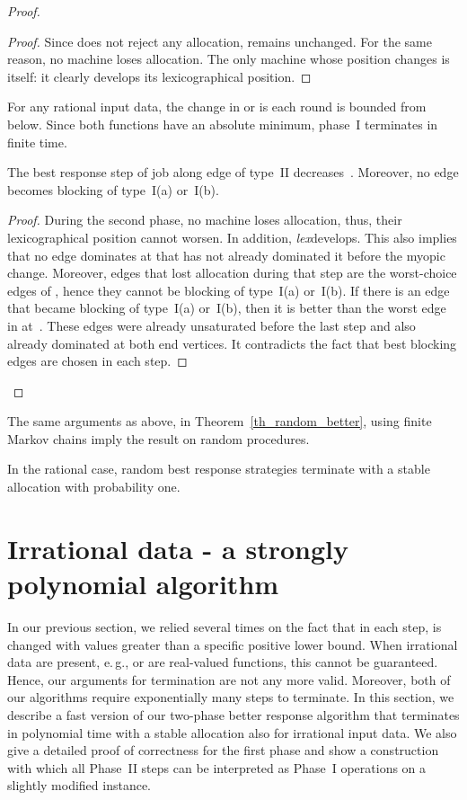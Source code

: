 \documentclass{llncs}
\newcommand{\lex}{{\slshape lex}}
\newcommand{\eg}{{e.\,g.}}
\begin{document}
\begin{proof}
	\begin{proof}
		 Since  does not reject any allocation,  remains unchanged. For the same reason, no machine loses allocation. The only machine whose position changes is  itself: it clearly develops its lexicographical position.
	\end{proof}
	
	For any rational input data, the change in  or  is each round is bounded from below. Since both functions have an absolute minimum, phase~I terminates in finite time.
	
	\begin{claim}
		The best response step of job  along edge  of type~II decreases~. Moreover, no edge becomes blocking of type~I(a) or~I(b).
	\end{claim}
	
	\begin{proof}
		 During the second phase, no machine loses allocation, thus, their lexicographical position cannot worsen. In addition, \lex develops. This also implies that no edge  dominates  at  that has not already dominated it before the myopic change. Moreover, edges that lost allocation during that step are the worst-choice edges of , hence they cannot be blocking of type~I(a) or~I(b). If there is an edge  that became blocking of type~I(a) or~I(b), then it is better than the worst edge in  at~. These edges were already unsaturated before the last step and also already dominated  at both end vertices. It contradicts the fact that best blocking edges are chosen in each step.
	\end{proof}
\end{proof}

The same arguments as above, in Theorem~\ref{th_random_better}, using finite Markov chains imply the result on random procedures.

\begin{theorem}
	In the rational case, random best response strategies terminate with a stable allocation with probability one.
\end{theorem}

\section{Irrational data - a strongly polynomial algorithm}
\label{sec:irrat}

In our previous section, we relied several times on the fact that in each step,  is changed with values greater than a specific positive lower bound. When irrational data are present, \eg,  or  are real-valued functions, this cannot be guaranteed. Hence, our arguments for termination are not any more valid. Moreover, both of our algorithms require exponentially many steps to terminate. In this section, we describe a fast version of our two-phase better response algorithm that terminates in polynomial time with a stable allocation also for irrational input data. We also give a detailed proof of correctness for the first phase and show a construction with which all Phase~II steps can be interpreted as Phase~I operations on a slightly modified instance.
\end{document}
